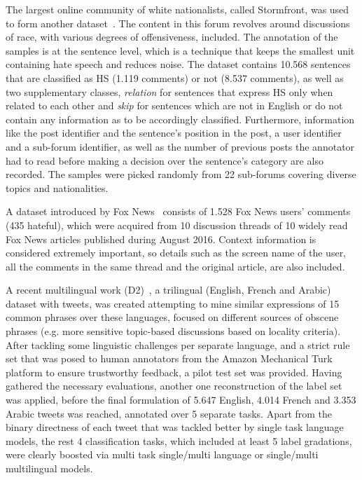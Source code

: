 \documentclass{article}
\begin{document}
The largest online community of white nationalists, called Stormfront, was used to form another dataset~\cite{whitesupremacist}. The content in this forum revolves around discussions of race, with various degrees of offensiveness, included. The annotation of the samples is at the sentence level, which is a technique that keeps the smallest unit containing hate speech and reduces noise. The dataset contains 10.568 sentences that are classified as HS (1.119 comments) or not (8.537 comments), as well as two supplementary classes, {\em relation} for sentences that express HS only when related to each other and {\em skip} for sentences which are not in English or do not contain any information as to be accordingly classified. Furthermore, information like the post identifier and the sentence’s position in the post, a user identifier and a sub-forum identifier, as well as the number of previous posts the annotator had to read before making a decision over the sentence’s category are also recorded. The samples were picked randomly from 22 sub-forums covering diverse topics and nationalities. 

A dataset introduced by Fox News~\cite{foxnews} consists of 1.528 Fox News users' comments (435 hateful), which were acquired from 10 discussion threads of 10 widely read Fox News articles published during August 2016. Context information is considered extremely important, so details such as the screen name of the user, all the comments in the same thread and the original article, are also included.



A recent multilingual work (D2)~\cite{DBLP:conf/emnlp/OusidhoumLZSY19}, a trilingual (English, French and Arabic) dataset with tweets, was created attempting to mine similar expressions of 15 common phrases over these languages, focused on different sources of obscene phrases (e.g. more sensitive topic-based discussions based on locality criteria). After tackling some linguistic challenges per separate language, and a strict rule set that was posed to human annotators from the Amazon Mechanical Turk platform to ensure trustworthy feedback, a pilot test set was provided. Having gathered the necessary evaluations, another one reconstruction of the label set was applied, before the final formulation of 5.647 English, 4.014 French and 3.353 Arabic tweets was reached, annotated over 5 separate tasks. Apart from the binary directness of each tweet that was tackled better by single task language models, the rest 4 classification tasks, which included at least 5 label gradations, were clearly boosted via multi task single/multi language or single/multi multilingual models.
\end{document}
